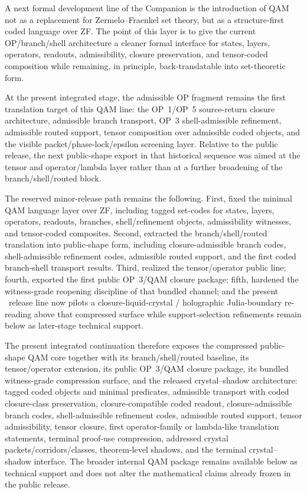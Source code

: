 \begin{remark}
A next formal development line of the Companion is the introduction of QAM not as a replacement for Zermelo--Fraenkel set theory, but as a structure-first coded language over ZF. The point of this layer is to give the current OP/branch/shell architecture a cleaner formal interface for states, layers, operators, readouts, admissibility, closure preservation, and tensor-coded composition while remaining, in principle, back-translatable into set-theoretic form.

At the present integrated stage, the admissible OP fragment remains the first translation target of this QAM line: the OP~1/OP~5 source-return closure architecture, admissible branch transport, OP~3 shell-admissible refinement, admissible routed support, tensor composition over admissible coded objects, and the visible packet/phase-lock/epsilon screening layer. Relative to the public  release, the next public-shape export in that historical sequence was aimed at the tensor and operator/lambda layer rather than at a further broadening of the branch/shell/routed block.

The reserved minor-release path remains the following. First,  fixed the minimal QAM language layer over ZF, including tagged set-codes for states, layers, operators, readouts, branches, shell/refinement objects, admissibility witnesses, and tensor-coded composites. Second,  extracted the branch/shell/routed translation into public-shape form, including closure-admissible branch codes, shell-admissible refinement codes, admissible routed support, and the first coded branch-shell transport results. Third,  realized the tensor/operator public line; fourth,  exported the first public OP~3/QAM closure package; fifth,  hardened the witness-grade reopening discipline of that bundled channel; and the present \docversion\ release line now pilots a closure-liquid-crystal / holographic Julia-boundary re-reading above that compressed surface while support-selection refinements remain below as later-stage technical support.

The present integrated continuation therefore exposes the compressed public-shape QAM core together with its branch/shell/routed baseline, its tensor/operator extension, its public OP~3/QAM closure package, its bundled witness-grade compression surface, and the released  crystal--shadow architecture: tagged coded objects and minimal predicates, admissible transport with coded closure-class preservation, closure-compatible coded readout, closure-admissible branch codes, shell-admissible refinement codes, admissible routed support, tensor admissibility, tensor closure, first operator-family or lambda-like translation statements, terminal proof-use compression, addressed crystal packets/corridors/classes, theorem-level shadows, and the terminal crystal--shadow interface. The broader internal QAM package remains available below as technical support and does not alter the mathematical claims already frozen in the public  release.


\end{remark}
